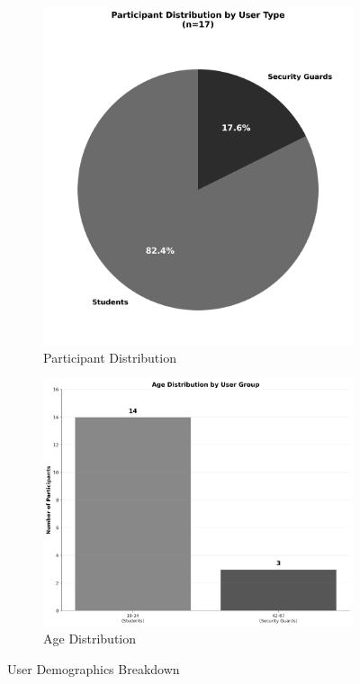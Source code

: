\begin{figure}[htbp]
    \centering
    \begin{subfigure}[t]{0.48\textwidth}
        \centering
        \includegraphics[width=\textwidth]{figs/chapter5/demographics_distribution.png}
        \caption{Participant Distribution}
        \label{fig:demographics_distribution}
    \end{subfigure}
    \hfill
    \begin{subfigure}[t]{0.48\textwidth}
        \centering
        \includegraphics[width=\textwidth]{figs/chapter5/demographics_age.png}
        \caption{Age Distribution}
        \label{fig:demographics_age}
    \end{subfigure}
    \caption{User Demographics Breakdown}
    \label{fig:user_demographics}
\end{figure}

